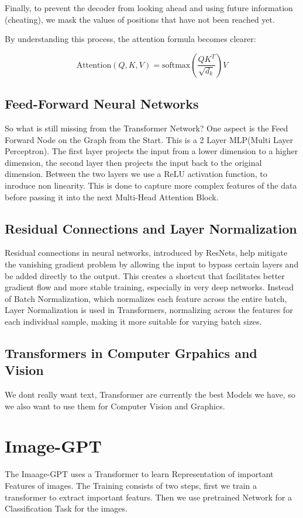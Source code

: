 \documentclass[a4paper]{article}
\begin{document}
Finally, to prevent the decoder from looking ahead and using future information (cheating), we mask the values of positions that have not been reached yet.

By understanding this process, the attention formula becomes clearer:

\[ \text{Attention}(Q, K, V) = \text{softmax}\left(\frac{QK^T}{\sqrt{d_k}}\right)V \]


\subsection{Feed-Forward Neural Networks}
So what is still missing from the Transformer Network? One aspect is the Feed Forward Node on the Graph from the Start. This is a 2 Layer MLP(Multi Layer Perceptron). The first layer projects the input from a lower dimension to a higher dimension, the second layer then projects the input back to the original dimension. 
Between the two layers we use a ReLU activation function, to inroduce non linearity. This is done to capture more complex features of the data before passing it into the next Multi-Head Attention Block. 
\subsection{Residual Connections and Layer Normalization}
Residual connections in neural networks, introduced by ResNets, help mitigate the vanishing gradient problem by allowing the input to bypass certain layers and be added directly to the output. This creates a shortcut that facilitates better gradient flow and more stable training, especially in very deep networks. Instead of Batch Normalization, which normalizes each feature across the entire batch, Layer Normalization is used in Transformers, normalizing across the features for each individual sample, making it more suitable for varying batch sizes. 

\subsection{Transformers in Computer Grpahics and Vision}   
We dont really want text, Transformer are currently the best Models we have, so we also want to use them for Computer Vision and Graphics.

\section{Image-GPT}
The Imaage-GPT uses a Transformer to learn Representation of important Features of images. The Training consists of two steps, first we train a transformer to extract important featurs. Then we use pretrained Network for a Classification Task for the images. 
\end{document}
